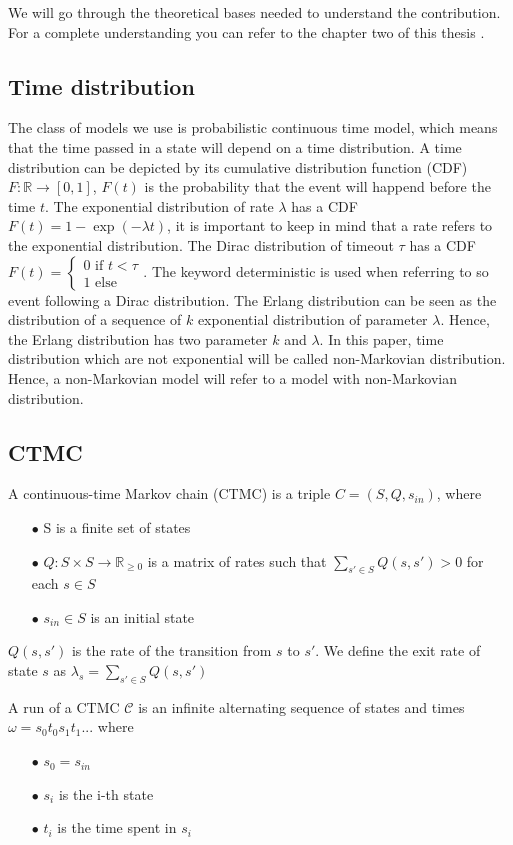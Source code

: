 We will go through the theoretical bases needed to understand the contribution. For a complete understanding you can refer to the chapter two of this thesis \cite{Korenciak2018thesis}.
\subsection{Time distribution}
The class of models we use is probabilistic continuous time model, which means that the time passed in a state will depend on a time distribution. A time distribution can be depicted by its cumulative distribution function (CDF) $F : \mathbb{R} \rightarrow[0,1]$, $F(t)$ is the probability that the event will happend before the time $t$. The exponential distribution of rate $\lambda$ has a CDF $F(t) = 1 - \exp(-\lambda t)$, it is important to keep in mind that a rate refers to the exponential distribution. The Dirac distribution of timeout $\tau$ has a CDF $F(t) = 
\left\{
	\begin{array}{l}
		0 \text{ if } t < \tau\\
		1\text{ else}
	\end{array}
\right.$. The keyword deterministic is used when referring to so event following a Dirac distribution.
The Erlang distribution can be seen as the distribution of a sequence of $k$ exponential distribution of parameter $\lambda$. Hence, the Erlang distribution has two parameter $k$ and $\lambda$. 
In this paper, time distribution which are not exponential will be called non-Markovian distribution. Hence, a non-Markovian model will refer to a model with non-Markovian distribution.
\subsection{CTMC}
\label{CTMC_def}
A continuous-time Markov chain (CTMC) is a triple $C = (S,Q,s_{in})$, where 
\begin{itemize}
	\item[$\bullet$] S is a finite set of states
	\item[$\bullet$] $Q : S \times S \rightarrow \mathbb{R}_{\geq 0}$ is a matrix of rates such that $\sum_{s' \in S} Q(s,s')  > 0$ for each $s \in S$
	\item[$\bullet$] $s_{in} \in S$ is an initial state
\end{itemize} 
$Q(s,s')$ is the rate of the transition from $s$ to $s'$.
We define the exit rate of state $s$ as $\lambda_s = \sum_{s' \in S} Q(s,s')$

A run of a CTMC $\mathcal{C}$ is an infinite alternating sequence of states and times $\omega = s_0t_0s_1t_1...$ where 
\begin{itemize}
	\item[$\bullet$] $s_0 = s_{in}$
	\item[$\bullet$] $s_i$ is the i-th state
	\item[$\bullet$] $t_i$ is the time spent in $s_i$
\end{itemize}

